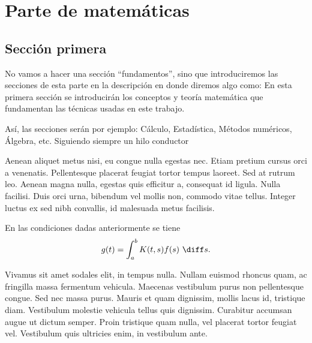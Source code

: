 \documentclass[oneside,openright,titlepage,numbers=noenddot,openany,headinclude,footinclude=true,
cleardoublepage=empty,abstractoff,BCOR=5mm,paper=a4,fontsize=12pt,main=spanish]{scrreprt}
\author{\AuthorName}
\date{\today}
\title{\ProjectTitle}
\begin{document}
\maketitle


\newpage






\tableofcontents

\part{Parte de matemáticas}

\chapter{Sección primera}
{\Large No vamos a hacer una sección ``fundamentos'', sino que introduciremos las secciones de esta parte en la descripción en donde diremos algo como: En esta primera sección se introducirán los conceptos y teoría matemática que fundamentan las técnicas usadas en este trabajo. 

Así, las secciones serán por ejemplo: Cálculo, Estadística, Métodos numéricos, Álgebra, etc. Siguiendo siempre un hilo conductor}




Aenean aliquet metus nisi, eu congue nulla egestas nec. Etiam pretium
cursus orci a venenatis. Pellentesque placerat feugiat tortor tempus
laoreet. Sed at rutrum leo. Aenean magna nulla, egestas quis efficitur
a, consequat id ligula. Nulla facilisi. Duis orci urna, bibendum vel
mollis non, commodo vitae tellus. Integer luctus ex sed nibh
convallis, id malesuada metus facilisis.

\begin{theorem}
En las condiciones dadas anteriormente se tiene
\[
g(t) = \int^b_a K(t,s)f(s)\ \diff s.
\]
\end{theorem}

Vivamus sit amet sodales elit, in tempus nulla. Nullam euismod rhoncus
quam, ac fringilla massa fermentum vehicula. Maecenas vestibulum purus
non pellentesque congue. Sed nec massa purus. Mauris et quam
dignissim, mollis lacus id, tristique diam. Vestibulum molestie
vehicula tellus quis dignissim. Curabitur accumsan augue ut dictum
semper. Proin tristique quam nulla, vel placerat tortor feugiat
vel. Vestibulum quis ultricies enim, in vestibulum ante.
\end{document}
